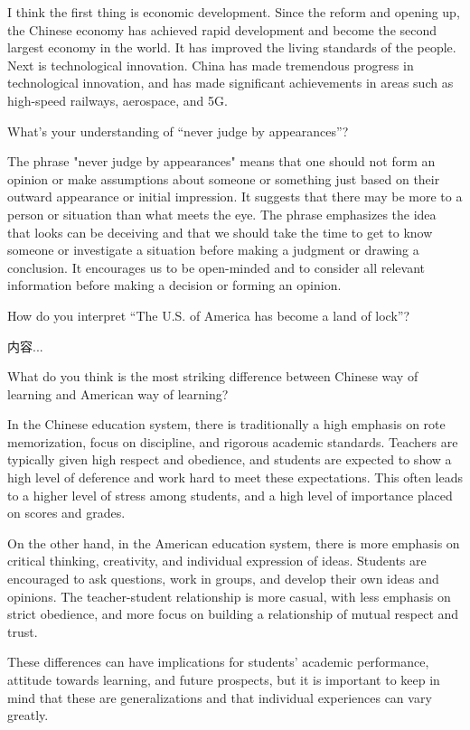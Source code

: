 \documentclass[lang=cn,10pt]{elegantbook}
\begin{document}
\begin{solution}
	I think the first thing is economic development. Since the reform and opening up, the Chinese economy has achieved rapid development and become the second largest economy in the world. It has improved the living standards of the people. Next is technological innovation. China has made tremendous progress in technological innovation, and has made significant achievements in areas such as high-speed railways, aerospace, and 5G.
\end{solution}
\begin{example}
	What’s your understanding of “never judge by appearances”?
\end{example}
\begin{solution}
	The phrase "never judge by appearances" means that one should not form an opinion or make assumptions about someone or something just based on their outward appearance or initial impression. It suggests that there may be more to a person or situation than what meets the eye. The phrase emphasizes the idea that looks can be deceiving and that we should take the time to get to know someone or investigate a situation before making a judgment or drawing a conclusion. It encourages us to be open-minded and to consider all relevant information before making a decision or forming an opinion.
\end{solution}
\begin{example}
	 How do you interpret “The U.S. of America has become a land of lock”?
\end{example}
\begin{solution}
	内容...
\end{solution}
\begin{example}
	What do you think is the most striking difference between Chinese way of learning and American way of learning?
\end{example}
\begin{solution}
	In the Chinese education system, there is traditionally a high emphasis on rote memorization, focus on discipline, and rigorous academic standards. Teachers are typically given high respect and obedience, and students are expected to show a high level of deference and work hard to meet these expectations. This often leads to a higher level of stress among students, and a high level of importance placed on scores and grades.
	
	On the other hand, in the American education system, there is more emphasis on critical thinking, creativity, and individual expression of ideas. Students are encouraged to ask questions, work in groups, and develop their own ideas and opinions. The teacher-student relationship is more casual, with less emphasis on strict obedience, and more focus on building a relationship of mutual respect and trust.
	
	These differences can have implications for students’ academic performance, attitude towards learning, and future prospects, but it is important to keep in mind that these are generalizations and that individual experiences can vary greatly.
	
\end{solution}
\end{document}
